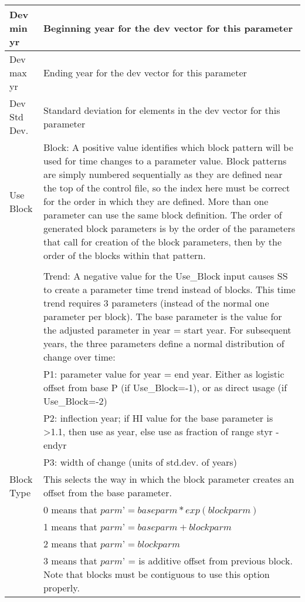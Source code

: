 \begin{center}
\begin{longtable}{p{2.5cm} p{13cm}}
		\hline
		Dev min yr & Beginning year for the dev vector for this parameter\\
		\hline
		Dev max yr & Ending year for the dev vector for this parameter\\
		\hline
		Dev Std Dev. & Standard deviation for elements in the dev vector for this parameter \\
		\hline
		Use Block & Block: A positive value identifies which block pattern will be used for time changes to a parameter value.  Block patterns are simply numbered sequentially as they are defined near the top of the control file, so the index here must be correct for the order in which they are defined.  More than one parameter can use the same block definition.  The order of generated block parameters is by the order of the parameters that call for creation of the block parameters, then by the order of the blocks within that pattern. \\ \\
				  & Trend:  A negative value for the Use\_Block input causes SS to create a parameter time trend instead of blocks.  This time trend requires 3 parameters (instead of the normal one parameter per block).  The base parameter is the value for the adjusted parameter in year = start year.  For subsequent years, the three parameters define a normal distribution of change over time:\\
				  & P1:  parameter value for year = end year.  Either as logistic offset from base P (if Use\_Block=-1), or as direct usage (if Use\_Block=-2)\\
				  & P2:  inflection year;  if HI value for the base parameter is >1.1, then use as year, else use as fraction of range styr - endyr\\
				  & P3:  width of change (units of std.dev. of years)\\
		\hline
		Block Type & This selects the way in which the block parameter creates an offset from the base parameter. \\
				   & 0 means that $parm’ = baseparm * exp(blockparm)$\\
				   & 1 means that $parm’ = baseparm + blockparm$\\
				   & 2 means that $parm’ = blockparm$\\
				   & 3 means that $parm’$ = is additive offset from previous block.  Note that blocks must be contiguous to use this option properly.\\
		\hline
	\end{longtable}
\end{center}

